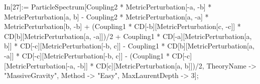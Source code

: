 In[27]:= ParticleSpectrum[Coupling2 * MetricPerturbation[-a, -b] * MetricPerturbation[a, b] - Coupling2 * MetricPerturbation[a, -a] * MetricPerturbation[b, -b] + (Coupling1 * CD[-b][MetricPerturbation[c, -c]] * CD[b][MetricPerturbation[a, -a]])/2 + Coupling1 * CD[-a][MetricPerturbation[a, b]] * CD[-c][MetricPerturbation[-b, c]] - Coupling1 * CD[b][MetricPerturbation[a, -a]] * CD[-c][MetricPerturbation[-b, c]] - (Coupling1 * CD[-c][MetricPerturbation[-a, -b]] * CD[c][MetricPerturbation[a, b]])/2, TheoryName -> "MassiveGravity", Method -> "Easy", MaxLaurentDepth -> 3]; 